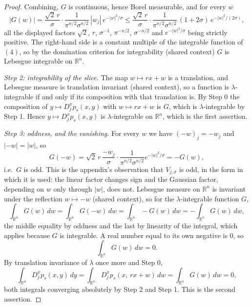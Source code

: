 \begin{proof}
Combining, $G$ is continuous, hence Borel measurable, and for every $w$
\[
  |G(w)|
    = \frac{\sqrt2\,r}{\sigma}\cdot\frac{1}{\pi^{n/2}\sigma^{n/2}}\,
      |w_j|\,e^{-|w|^2/\sigma}
    \leq \frac{\sqrt2\,r}{\sigma}\cdot\frac{1}{\pi^{n/2}\sigma^{n/2}}\,
      (1+2\sigma)\,e^{-|w|^2/(2\sigma)} ,
\]
all the displayed factors $\sqrt2$, $r$, $\sigma^{-1}$, $\pi^{-n/2}$,
$\sigma^{-n/2}$ and $e^{-|w|^2/\sigma}$ being strictly positive.  The
right-hand side is a constant multiple of the integrable function of $(4)$, so
by the domination criterion for integrability (shared context) $G$ is Lebesgue
integrable on $\mathbb{R}^n$.

\emph{Step 2: integrability of the slice.}
The map $w \mapsto rx+w$ is a translation, and Lebesgue measure is translation
invariant (shared context), so a function is $\lambda$-integrable if and only if
its composition with that translation is.  By Step 0 the composition of
$y \mapsto D_j^xp_s(x,y)$ with $w \mapsto rx+w$ is $G$, which is
$\lambda$-integrable by Step 1.  Hence $y \mapsto D_j^xp_s(x,y)$ is
$\lambda$-integrable on $\mathbb{R}^n$, which is the first assertion.

\emph{Step 3: oddness, and the vanishing.}
For every $w$ we have $(-w)_j = -w_j$ and $|-w| = |w|$, so
\[
  G(-w) = \sqrt2\,r\,\frac{-w_j}{\sigma}\cdot
      \frac{1}{\pi^{n/2}\sigma^{n/2}}e^{-|w|^2/\sigma} = -G(w) ,
\]
i.e.\ $G$ is odd.  This is the appendix's observation that
$V_{j,\sigma}$ is odd, in the form in which it is used: the linear factor
changes sign and the Gaussian factor, depending on $w$ only through $|w|$, does
not.  Lebesgue measure on $\mathbb{R}^n$ is invariant under the reflection
$w \mapsto -w$ (shared context), so for the $\lambda$-integrable function $G$,
\[
  \int_{\mathbb{R}^n} G(w)\,dw
    = \int_{\mathbb{R}^n} G(-w)\,dw
    = \int_{\mathbb{R}^n} -G(w)\,dw
    = -\int_{\mathbb{R}^n} G(w)\,dw ,
\]
the middle equality by oddness and the last by linearity of the integral, which
applies because $G$ is integrable.  A real number equal to its own negative is
$0$, so
\begin{equation*}
  \int_{\mathbb{R}^n} G(w)\,dw = 0 . \tag{5}
\end{equation*}
By translation invariance of $\lambda$ once more and Step 0,
\[
  \int_{\mathbb{R}^n} D_j^xp_s(x,y)\,dy
    = \int_{\mathbb{R}^n} D_j^xp_s(x,\,rx+w)\,dw
    = \int_{\mathbb{R}^n} G(w)\,dw
    = 0 ,
\]
both integrals converging absolutely by Step 2 and Step 1.  This is the second
assertion.
\end{proof}
